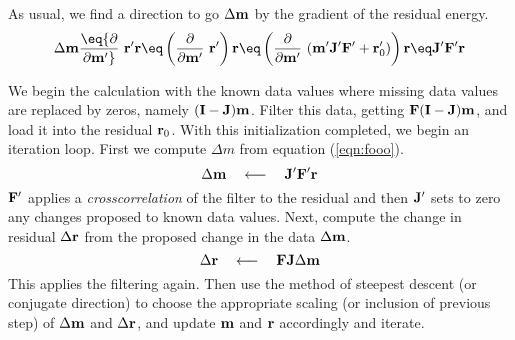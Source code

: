 As usual, we find a direction to go $\Delta \bold m$
by the gradient of the residual energy.
\begin{equation}
\Delta\bold m
\eq {\partial \over\partial \bold m'}\ \bold r'\bold r
\eq \left( {\partial \over\partial \bold m'} \ \bold r' \right) \bold r
\eq \left( {\partial \over\partial \bold m'} \
(\bold m'\bold J'\bold F' + \bold r'_0)                 \right) \bold r
\eq  \bold J' \bold F' \bold r
\label{eqn:fooo}
\end{equation}

\par
We begin the calculation with
the known data values where missing data values are replaced by zeros, namely
$(\bold I-\bold J)\bold m$.
Filter this data,
getting $\bold F(\bold I-\bold J)\bold m$,
and load it into the residual $\bold r_0$.
With this initialization completed,
we begin an iteration loop.
First we compute $\Delta m$ from equation (\ref{eqn:fooo}).
\begin{equation}
\Delta\bold m \quad\longleftarrow\quad \bold J' \bold F' \bold r
\end{equation}
$\bold F'$ applies a {\it crosscorrelation} of the filter to the residual
and then $\bold J'$ sets to zero any changes proposed to known data values.
Next, compute the change in residual $\Delta\bold r$
from the proposed change in the data $\Delta\bold m$.
\begin{equation}
\Delta\bold r \quad \longleftarrow \quad \bold F \bold J \Delta \bold m
\label{eqn:lastmistheory}
\end{equation}
This applies the filtering again.
Then use the method of steepest descent (or conjugate direction)
to choose the appropriate scaling (or inclusion of previous step)
of $\Delta \bold m$ and $\Delta \bold r$,
and update $\bold m$ and $\bold r$ accordingly
and iterate.

